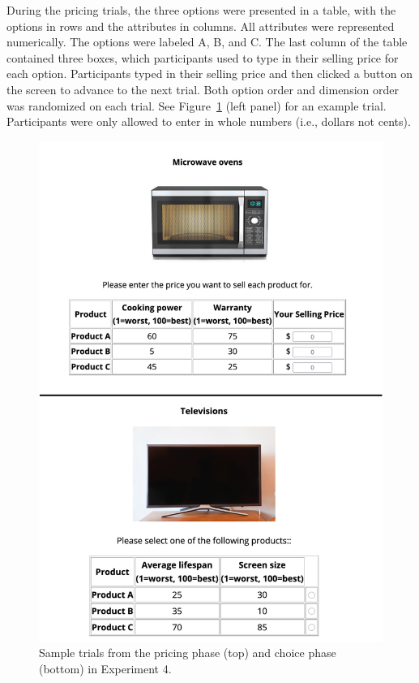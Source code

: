 During the pricing trials, the three options were presented in a table, with the options in rows and the attributes in columns. All attributes were represented numerically. The options were labeled A, B, and C. The last column of the table contained three boxes, which participants used to type in their selling price for each option. Participants typed in their selling price and then clicked a button on the screen to advance to the next trial. Both option order and dimension order was randomized on each trial. See Figure~\ref{fig:ce_rating_choice_trial} (left panel) for an example trial. Participants were only allowed to enter in whole numbers (i.e., dollars not cents).

\begin{figure}
    \includegraphics{figures/ce_rating_choice_example_trial.jpg}
    \caption{Sample trials from the pricing phase (top) and choice phase (bottom) in Experiment 4.}
    \label{fig:ce_rating_choice_trial}
\end{figure}

